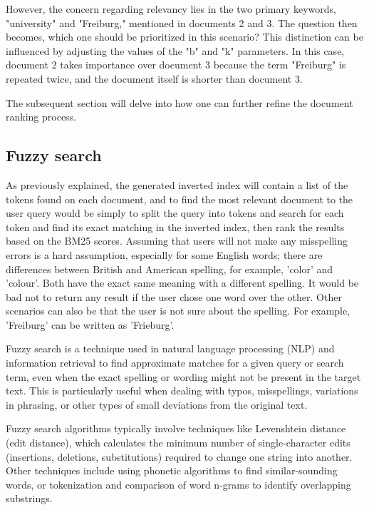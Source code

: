 However, the concern regarding relevancy lies in the two primary keywords, "university" and "Freiburg," mentioned in documents 2 and 3. The question then becomes, which one should be prioritized in this scenario? This distinction can be influenced by adjusting the values of the "b" and "k" parameters. In this case, document 2 takes importance over document 3 because the term "Freiburg" is repeated twice, and the document itself is shorter than document 3.

The subsequent section will delve into how one can further refine the document ranking process.


\subsection{Fuzzy search}
As previously explained, the generated inverted index will contain a list of the tokens found on each document, and to find the most relevant document to the user query would be simply to split the query into tokens and search for each token and find its exact matching in the inverted index, then rank the results based on the BM25 scores. Assuming that users will not make any misspelling errors is a hard assumption, especially for some English words; there are differences between British and American spelling, for example, 'color' and 'colour'. Both have the exact same meaning with a different spelling. It would be bad not to return any result if the user chose one word over the other. Other scenarios can also be that the user is not sure about the spelling. For example, 'Freiburg' can be written as 'Frieburg'.  

Fuzzy search is a technique used in natural language processing (NLP) and information retrieval to find approximate matches for a given query or search term, even when the exact spelling or wording might not be present in the target text. This is particularly useful when dealing with typos, misspellings, variations in phrasing, or other types of small deviations from the original text.

Fuzzy search algorithms typically involve techniques like Levenshtein distance (edit distance), which calculates the minimum number of single-character edits (insertions, deletions, substitutions) required to change one string into another. Other techniques include using phonetic algorithms to find similar-sounding words, or tokenization and comparison of word n-grams to identify overlapping substrings.


